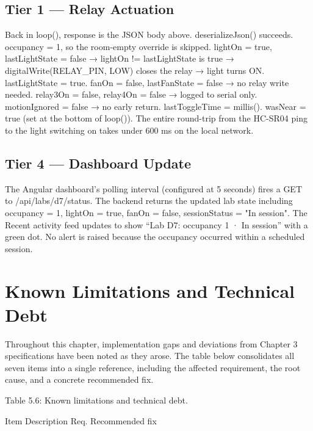 \subsection{Tier 1 --- Relay Actuation}


Back in loop(), response is the JSON body above. deserializeJson() succeeds.
occupancy = 1, so the room-empty override is skipped. lightOn = true, lastLightState
= false → lightOn != lastLightState is true → digitalWrite(RELAY\_PIN, LOW)
closes the relay → light turns ON. lastLightState = true. fanOn = false, lastFanState
= false → no relay write needed. relay3On = false, relay4On = false → logged to
serial only. motionIgnored = false → no early return. lastToggleTime = millis().
wasNear = true (set at the bottom of loop()). The entire round-trip from the HC-SR04
ping to the light switching on takes under 600 ms on the local network.



\subsection{Tier 4 --- Dashboard Update}


The Angular dashboard's polling interval (conﬁgured at 5 seconds) ﬁres a GET to /api/labs/d7/status.
The backend returns the updated lab state including occupancy = 1, lightOn = true,
fanOn = false, sessionStatus = "In session". The Recent activity feed updates to
show ``Lab D7: occupancy 1 · In session'' with a green dot. No alert is raised because the
occupancy occurred within a scheduled session.



\section{Known Limitations and Technical Debt}


Throughout this chapter, implementation gaps and deviations from Chapter 3 speciﬁcations
have been noted as they arose. The table below consolidates all seven items into a single
reference, including the affected requirement, the root cause, and a concrete recommended
ﬁx.






Table 5.6: Known limitations and technical debt.


Item Description Req. Recommended ﬁx

